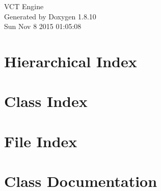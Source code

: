 \documentclass[twoside]{book}
\newcommand{\+}{\discretionary{\mbox{\scriptsize$\hookleftarrow$}}{}{}}
\newcommand{\clearemptydoublepage}{%
  \newpage{\pagestyle{empty}\cleardoublepage}%
}
\begin{document}
\hypersetup{pageanchor=false,
             bookmarks=true,
             bookmarksnumbered=true,
             pdfencoding=unicode
            }
\begin{titlepage}
\vspace*{7cm}
\begin{center}%
{\Large V\+C\+T Engine }\\
\vspace*{1cm}
{\large Generated by Doxygen 1.8.10}\\
\vspace*{0.5cm}
{\small Sun Nov 8 2015 01:05:08}\\
\end{center}
\end{titlepage}
\clearemptydoublepage
\tableofcontents
\clearemptydoublepage
{}
\hypersetup{pageanchor=true}

\chapter{Hierarchical Index}

\chapter{Class Index}

\chapter{File Index}

\chapter{Class Documentation}































\end{document}
